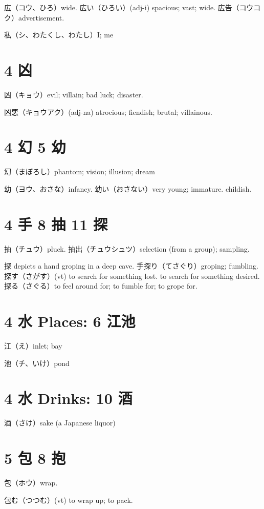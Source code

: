 広（コウ、ひろ）wide.
広い（ひろい）(adj-i) spacious; vast; wide.
広告（コウコク）advertisement.

私（シ、わたくし、わたし）I; me

\section{4 凶}

凶（キョウ）evil; villain; bad luck; disaster.

凶悪（キョウアク）(adj-na) atrocious; fiendish; brutal; villainous.

\section{4 幻 5 幼}

幻（まぼろし）phantom; vision; illusion; dream

幼（ヨウ、おさな）infancy.
幼い（おさない）very young; immature. childish.

\section{4 手 8 抽 11 探}

抽（チュウ）pluck.
抽出（チュウシュツ）selection (from a group); sampling.

探 depicts a hand groping in a deep cave.
手探り（てさぐり）groping; fumbling.
探す（さがす）(vt)
to search for something lost.
to search for something desired.
探る（さぐる）to feel around for; to fumble for; to grope for.

\section{4 水 Places: 6 江池}

江（え）inlet; bay

池（チ、いけ）pond

\section{4 水 Drinks: 10 酒}

酒（さけ）sake (a Japanese liquor)

\section{5 包 8 抱}

包（ホウ）wrap.

包む（つつむ）(vt) to wrap up; to pack.


